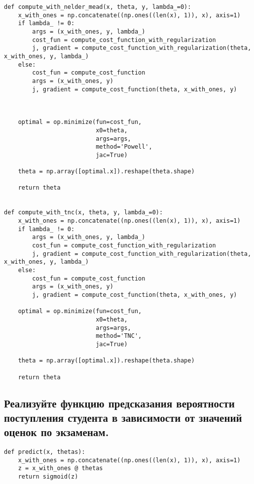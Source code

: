 \begin{lstlisting}
def compute_with_nelder_mead(x, theta, y, lambda_=0):
    x_with_ones = np.concatenate((np.ones((len(x), 1)), x), axis=1)
    if lambda_ != 0:
        args = (x_with_ones, y, lambda_)
        cost_fun = compute_cost_function_with_regularization
        j, gradient = compute_cost_function_with_regularization(theta, x_with_ones, y, lambda_)
    else:
        cost_fun = compute_cost_function
        args = (x_with_ones, y)
        j, gradient = compute_cost_function(theta, x_with_ones, y)



    optimal = op.minimize(fun=cost_fun,
                          x0=theta,
                          args=args,
                          method='Powell',
                          jac=True)

    theta = np.array([optimal.x]).reshape(theta.shape)

    return theta


def compute_with_tnc(x, theta, y, lambda_=0):
    x_with_ones = np.concatenate((np.ones((len(x), 1)), x), axis=1)
    if lambda_ != 0:
        args = (x_with_ones, y, lambda_)
        cost_fun = compute_cost_function_with_regularization
        j, gradient = compute_cost_function_with_regularization(theta, x_with_ones, y, lambda_)
    else:
        cost_fun = compute_cost_function
        args = (x_with_ones, y)
        j, gradient = compute_cost_function(theta, x_with_ones, y)

    optimal = op.minimize(fun=cost_fun,
                          x0=theta,
                          args=args,
                          method='TNC',
                          jac=True)

    theta = np.array([optimal.x]).reshape(theta.shape)

    return theta
\end{lstlisting}

\subsection{Реализуйте функцию предсказания вероятности поступления студента в зависимости от значений оценок по экзаменам.}

\begin{lstlisting}
def predict(x, thetas):
    x_with_ones = np.concatenate((np.ones((len(x), 1)), x), axis=1)
    z = x_with_ones @ thetas
    return sigmoid(z)
\end{lstlisting}

